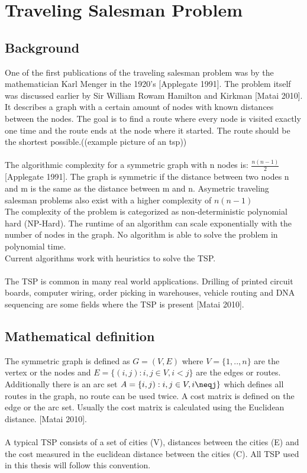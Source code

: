 \chapter{Traveling Salesman Problem}
\label{chap:tsp}
\section{Background}
One of the first publications of the traveling salesman problem was by the mathematician Karl Menger in the 1920's [Applegate 1991]. The problem itself was discussed earlier by Sir William Rowam Hamilton and Kirkman [Matai 2010]. It describes a graph with a certain amount of nodes with known distances between the nodes. The goal is to find a route where every node is visited exactly one time and the route ends at the node where it started. The route should be the shortest possible.((example picture of an tsp))\\\\
The algorithmic complexity for a symmetric graph with n nodes is: $\frac{n(n-1)}{2}$ [Applegate 1991].
The graph is symmetric if the distance between two nodes n and m is the same as the distance between m and n. Asymetric traveling salesman problems also exist with a higher complexity of $n(n-1)$\\
The complexity of the problem is categorized as non-deterministic polynomial hard (NP-Hard). The runtime of an algorithm can scale exponentially with the number of nodes in the graph. No algorithm is able to solve the problem in polynomial time.\\
Current algorithms work with heuristics to solve the TSP.\\\\
The TSP is common in many real world applications. Drilling of printed circuit boards, computer wiring, order picking in warehouses, vehicle routing and DNA sequencing are some fields where the TSP is present [Matai 2010].
\section{Mathematical definition}
The symmetric graph is defined as $G=(V,E)$ where $V=\{1,..,n\}$ are the vertex or the nodes and $E=\{(i,j):i,j\in V, i<j\}$ are the edges or routes. Additionally there is an arc set $A=\{i,j):i,j\in V, i\neqj\}$ which defines all routes in the graph, no route can be used twice. A cost matrix is defined on the edge or the arc set. Usually the cost matrix is calculated using the Euclidean distance. [Matai 2010].\\\\
A typical TSP consists of a set of cities (V), distances between the cities (E) and the cost measured in the euclidean distance between the cities (C). All TSP used in this thesis will follow this convention. 


 


